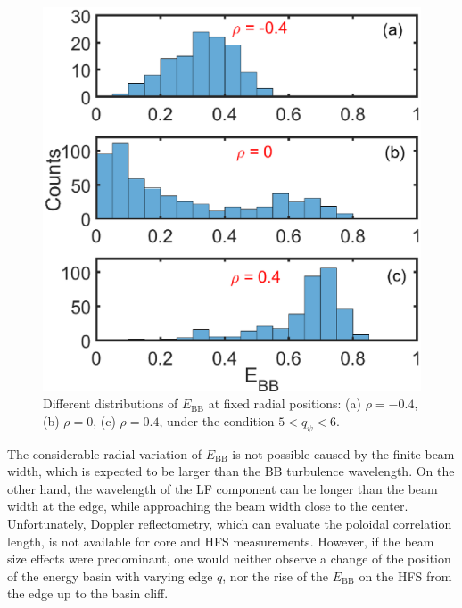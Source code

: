 \begin{figure}[h]
\begin{centering}
\includegraphics[scale=0.62]{fig_HistEBB.eps}
\par\end{centering}
\caption{Different distributions of $E_\mathrm{BB}$ at fixed radial positions: (a) $\rho = -0.4$, (b) $\rho = 0$, (c) $\rho = 0.4$, under the condition $5 < q_{\psi} < 6$.}
\label{fig:HistEBB}
\end{figure}


The considerable radial variation of $E_\mathrm{BB}$ is not possible caused by the finite beam width, which is expected to be larger than the BB turbulence wavelength. On the other hand, the wavelength of the LF component can be longer than the beam width at the edge, while approaching the beam width close to the center. Unfortunately, Doppler reflectometry, which can evaluate the poloidal correlation length, is not available for core and HFS measurements. However, if the beam size effects were predominant, one would neither observe a change of the position of the energy basin with varying edge $q$, nor the rise of the $E_\mathrm{BB}$ on the HFS from the edge up to the basin cliff.

